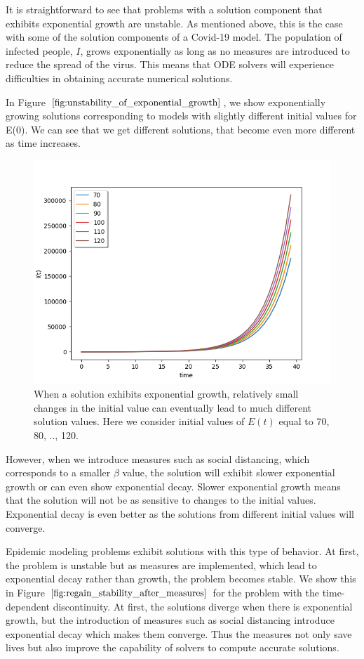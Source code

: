 It is straightforward to see that problems with a solution component that exhibits exponential growth are unstable. As mentioned above, this is the case with some of the solution components of a Covid-19 model. The population of infected people, $I$, grows exponentially as long as no measures are introduced to reduce the spread of the virus. This means that ODE solvers will experience difficulties in obtaining accurate numerical solutions. 

In Figure $\ref{fig:unstability_of_exponential_growth}$, we show exponentially growing solutions corresponding to models with slightly different initial values for E(0). We can see that we get different solutions, that become even more different as time increases.

\begin{figure}[H]
\centering
\includegraphics[width=0.7\linewidth]{./figures/unstability_of_exponential_growth}
\caption{When a solution exhibits exponential growth, relatively small changes in the initial value can eventually lead to much different solution values. Here we consider initial values of $E(t)$ equal to 70, 80, .., 120.}
\label{fig:unstability_of_exponential_growth}
\end{figure}

However, when we introduce measures such as social distancing, which corresponds to a smaller $\beta$ value, the solution will exhibit slower exponential growth or can even show exponential decay. Slower exponential growth means that the solution will not be as sensitive to changes to the initial values. Exponential decay is even better as the solutions from different initial values will converge.

Epidemic modeling problems exhibit solutions with this type of behavior. At first, the problem is unstable but as measures are implemented, which lead to exponential decay rather than growth, the problem becomes stable. We show this in Figure $\ref{fig:regain_stability_after_measures}$ for the problem with the time-dependent discontinuity. At first, the solutions diverge when there is exponential growth, but the introduction of measures such as social distancing introduce exponential decay which makes them converge. Thus the measures not only save lives but also improve the capability of solvers to compute accurate solutions.

